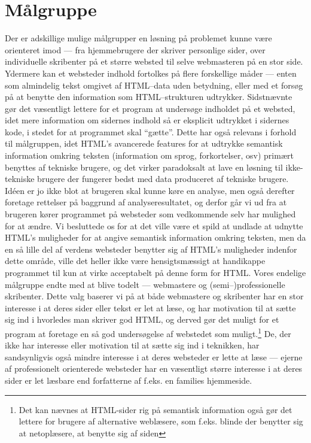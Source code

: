 \documentclass[a4paper,oneside]{memoir}
\begin{document}
\section{Målgruppe}
\label{målgruppe}
Der er adskillige mulige målgrupper en løsning på problemet kunne være
orienteret imod --- fra hjemmebrugere der skriver personlige sider,
over individuelle skribenter på et større websted til selve
webmasteren på en stor side. Ydermere kan et websteder indhold
fortolkes på flere forskellige måder --- enten som almindelig tekst
omgivet af HTML--data uden betydning, eller med et forsøg på at
benytte den information som HTML--strukturen udtrykker. Sidstnævnte
gør det væsentligt lettere for et program at undersøge indholdet på et
websted, idet mere information om sidernes indhold så er eksplicit
udtrykket i sidernes kode, i stedet for at programmet skal
``gætte''. Dette har også relevans i forhold til målgruppen, idet
HTML's avancerede features for at udtrykke semantisk information
omkring teksten (information om sprog, forkortelser, osv) primært
benyttes af tekniske brugere, og det virker paradoksalt at lave en
løsning til ikke-tekniske brugere der fungerer bedst med data
produceret af tekniske brugere. Idéen er jo ikke blot at brugeren skal
kunne køre en analyse, men også derefter foretage rettelser på
baggrund af analyseresultatet, og derfor går vi ud fra at brugeren
kører programmet på websteder som vedkommende selv har mulighed for at
ændre. Vi besluttede os for at det ville være et spild at undlade at
udnytte HTML's muligheder for at angive semantisk information omkring
teksten, men da en så lille del af verdens websteder benytter sig af
HTML's muligheder indenfor dette område, ville det heller ikke være
hensigtsmæssigt at handikappe programmet til kun at virke acceptabelt
på denne form for HTML. Vores endelige målgruppe endte med at blive
todelt --- webmastere og (semi--)professionelle skribenter. Dette valg
baserer vi på at både webmastere og skribenter har en stor interesse i
at deres sider eller tekst er let at læse, og har motivation til at
sætte sig ind i hvorledes man skriver god HTML, og derved gør det
muligt for et program at foretage en så god undersøgelse af webstedet
som muligt.\footnote{Det kan nævnes at HTML-sider rig på semantisk
  information også gør det lettere for brugere af alternative
  weblæsere, som f.eks. blinde der benytter sig at netoplæsere, at
  benytte sig af siden} De, der ikke har interesse eller motivation
til at sætte sig ind i teknikken, har sandsynligvis også mindre
interesse i at deres websteder er lette at læse --- ejerne af
professionelt orienterede websteder har en væsentligt større interesse
i at deres sider er let læsbare end forfatterne af f.eks. en families
hjemmeside.
\end{document}
